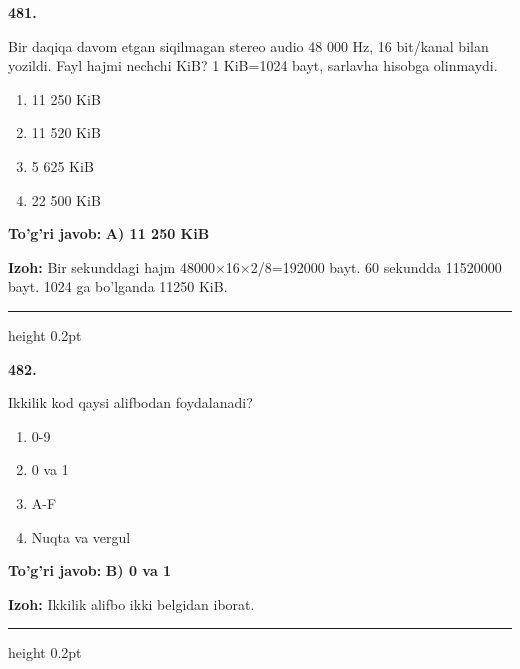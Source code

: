 \documentclass[10pt,a4paper,oneside]{article}
\begin{document}
\noindent\textbf{\color{ink}481.}
\par
Bir daqiqa davom etgan siqilmagan stereo audio 48 000 Hz, 16 bit/kanal bilan yozildi. Fayl hajmi nechchi KiB? 1 KiB=1024 bayt, sarlavha hisobga olinmaydi.
\begin{enumerate}[label=\Alph*),leftmargin=9mm]
\item 11 250 KiB
\item 11 520 KiB
\item 5 625 KiB
\item 22 500 KiB
\end{enumerate}
\begin{tcolorbox}[enhanced,breakable,colback=teal!4,colframe=teal!50!black,boxrule=0.5pt,arc=1.1mm,left=3mm,right=3mm,top=1.7mm,bottom=1.7mm,before skip=2mm,after skip=2mm]
\textbf{\color{teal}To'g'ri javob:} \textbf{A) 11 250 KiB}
\par\smallskip
\textbf{Izoh:} Bir sekunddagi hajm 48000\ensuremath{\times}16\ensuremath{\times}2/8=192000 bayt. 60 sekundda 11520000 bayt. 1024 ga bo'lganda 11250 KiB.
\end{tcolorbox}
\vspace{2mm}\hrule height 0.2pt \vspace{3mm}

\noindent\textbf{\color{ink}482.}
\par
Ikkilik kod qaysi alifbodan foydalanadi?
\begin{enumerate}[label=\Alph*),leftmargin=9mm]
\item 0-9
\item 0 va 1
\item A-F
\item Nuqta va vergul
\end{enumerate}
\begin{tcolorbox}[enhanced,breakable,colback=teal!4,colframe=teal!50!black,boxrule=0.5pt,arc=1.1mm,left=3mm,right=3mm,top=1.7mm,bottom=1.7mm,before skip=2mm,after skip=2mm]
\textbf{\color{teal}To'g'ri javob:} \textbf{B) 0 va 1}
\par\smallskip
\textbf{Izoh:} Ikkilik alifbo ikki belgidan iborat.
\end{tcolorbox}
\vspace{2mm}\hrule height 0.2pt \vspace{3mm}
\end{document}
